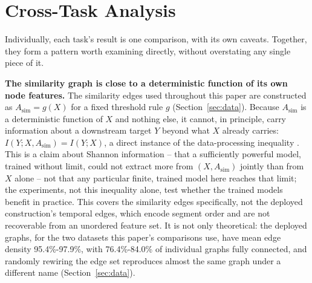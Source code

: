 \section{Cross-Task Analysis}\label{sec:cross-task}

Individually, each task's result is one comparison, with its own caveats. Together, they form
a pattern worth examining directly, without overstating any single piece of it.

\textbf{The similarity graph is close to a deterministic function of its own node features.}
The similarity edges used throughout this paper are constructed as $A_{\mathrm{sim}}=g(X)$
for a fixed threshold rule $g$ (Section~\ref{sec:data}). Because $A_{\mathrm{sim}}$ is a
deterministic function of $X$ and nothing else, it cannot, in principle, carry information
about a downstream target $Y$ beyond what $X$ already carries:
$I(Y;X,A_{\mathrm{sim}})=I(Y;X)$, a direct instance of the data-processing inequality
\cite{cover2006elements}. This is a claim about Shannon information -- that a sufficiently
powerful model, trained without limit, could not extract more from $(X,A_{\mathrm{sim}})$
jointly than from $X$ alone -- not that any particular finite, trained model here reaches
that limit; the experiments, not this inequality alone, test whether the trained models
benefit in practice. This covers the similarity edges specifically, not the deployed
construction's temporal edges, which encode segment order and are not recoverable from an
unordered feature set. It is not only theoretical: the deployed graphs, for the two datasets
this paper's comparisons use, have mean edge density 95.4\%-97.9\%, with 76.4\%-84.0\% of
individual graphs fully connected, and randomly rewiring the edge set reproduces almost the
same graph under a different name (Section~\ref{sec:data}).

